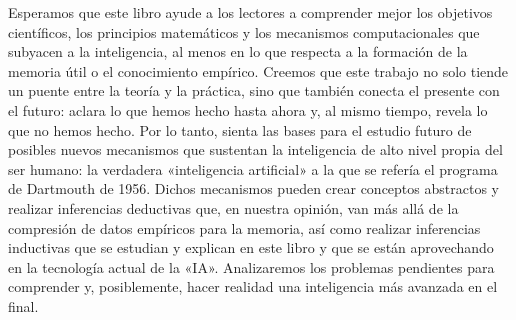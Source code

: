 \documentclass[../../book-main_es.tex]{subfiles}
\begin{document}
Esperamos que este libro ayude a los lectores a comprender mejor los objetivos científicos,
los principios matemáticos y los mecanismos computacionales que subyacen a la 
inteligencia, al menos en lo que respecta a la formación de la memoria útil
o el conocimiento empírico. Creemos que este trabajo no solo tiende un puente 
entre la teoría y la práctica, sino que también conecta el presente con el futuro: 
aclara lo que hemos hecho hasta ahora y, al mismo tiempo, revela lo que no hemos hecho.
Por lo tanto, sienta las bases para el estudio futuro de posibles nuevos mecanismos 
que sustentan la inteligencia de alto nivel propia del ser humano: la verdadera 
«inteligencia artificial» a la que se refería el programa de Dartmouth de 1956.
Dichos mecanismos pueden crear conceptos abstractos y realizar inferencias deductivas 
que, en nuestra opinión, van más allá de la compresión de datos empíricos para la memoria, 
así como realizar inferencias inductivas que se estudian y explican en este
libro y que se están aprovechando en la tecnología actual de la «IA». Analizaremos
los problemas pendientes para comprender y, posiblemente, hacer realidad una inteligencia 
más avanzada en el  final.
\end{document}
